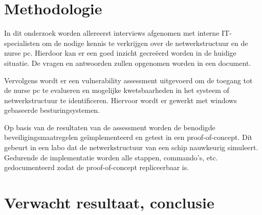 \section{Methodologie}%
\label{sec:methodologie}

In dit onderzoek worden allereerst interviews afgenomen met interne IT-specialisten om de nodige kennis te verkrijgen over de netwerkstructuur en de nurse pc. 
Hierdoor kan er een goed inzicht gecreëerd worden in de huidige situatie. De vragen en antwoorden zullen opgenomen worden in een document.

Vervolgens wordt er een vulnerability assessment uitgevoerd om de toegang tot de nurse pc te evalueren en mogelijke kwetsbaarheden in het systeem 
of netwerkstructuur te identificeren. Hiervoor wordt er gewerkt met windows gebaseerde besturingsystemen.

Op basis van de resultaten van de assessment worden de benodigde beveiligingsmaatregelen geïmplementeerd en getest in een proof-of-concept. 
Dit gebeurt in een labo dat de netwerkstructuur van een schip nauwkeurig simuleert. Gedurende de implementatie worden alle stappen, commando's, etc. gedocumenteerd zodat 
de proof-of-concept repliceerbaar is.


\section{Verwacht resultaat, conclusie}%
\label{sec:verwachte_resultaten}


